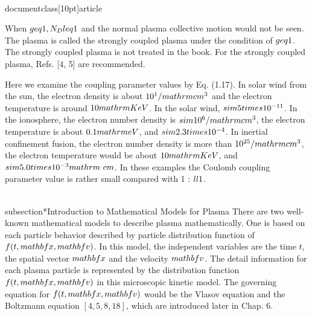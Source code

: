 \\documentclass[10pt]{article}
\begin{document}
When $\\geq 1, N_{D} \\leq 1$ and the normal plasma collective motion would not be seen. The plasma is called the strongly coupled plasma under the condition of $\\geq 1$. The strongly coupled plasma is not treated in the book. For the strongly coupled plasma, Refs. [4, 5] are recommended.

Here we examine the coupling parameter values by Eq. (1.17). In solar wind from the sun, the electron density is about $10^{1} / \\mathrm{cm}^{3}$ and the electron temperature is around $10 \\mathrm{KeV}$. In the solar wind, $\\sim 5 \\times 10^{-11}$. In the ionosphere, the electron number density is $\\sim 10^{6} / \\mathrm{cm}^{3}$, the electron temperature is about $0.1 \\mathrm{eV}$, and $\\sim 2.3 \\times 10^{-4}$. In inertial confinement fusion, the electron number density is more than $10^{25} / \\mathrm{cm}^{3}$, the electron temperature would be about $10 \\mathrm{KeV}$, and $\\sim 5.0 \\times 10^{-3} \\mathrm{~cm}$. In these examples the Coulomb coupling parameter value is rather small compared with 1 : $\\ll 1$.

\\subsection*{Introduction to Mathematical Models for Plasma}
There are two well-known mathematical models to describe plasma mathematically. One is based on each particle behavior described by particle distribution function of $f(t, \\mathbf{x}, \\mathbf{v})$. In this model, the independent variables are the time $t$, the spatial vector $\\mathbf{x}$ and the velocity $\\mathbf{v}$. The detail information for each plasma particle is represented by the distribution function $f(t, \\mathbf{x}, \\mathbf{v})$ in this microscopic kinetic model. The governing equation for $f(t, \\mathbf{x}, \\mathbf{v})$ would be the Vlasov equation and the Boltzmann equation $[4,5,8,18]$, which are introduced later in Chap. 6.
\end{document}
